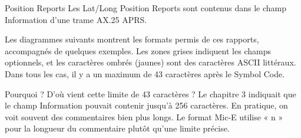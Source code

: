 \begin{aprssideblock}{Position Reports}
Les Lat/Long Position Reports sont contenus dans le champ Information
d'une trame AX.25 APRS.

Les diagrammes suivants montrent les formats permis de ces rapports,
accompagnés de quelques exemples. Les zones grises indiquent les champs
optionnels, et les caractères ombrés (jaunes) sont des caractères ASCII
littéraux. Dans tous les cas, il y a un maximum de 43 caractères après
le Symbol Code.

Pourquoi ? D'où vient cette limite de 43 caractères ? Le chapitre 3
indiquait que le champ Information pouvait contenir jusqu'à 256
caractères. En pratique, on voit souvent des commentaires bien plus
longs. Le format Mic-E utilise « n » pour la longueur du commentaire
plutôt qu'une limite précise.
\end{aprssideblock}

